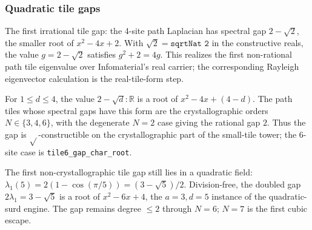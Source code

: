 \subsubsection{Quadratic tile gaps}

\begin{theorem}\label{thm:tile4-irrational-gap}\leanok{}
The first irrational tile gap: the 4-site path Laplacian has spectral gap
$2-\sqrt2$, the smaller root of $x^2-4x+2$. With
$\sqrt2=\texttt{sqrtNat 2}$ in the constructive reals, the value
$g=2-\sqrt2$ satisfies $g^2+2=4g$. This realizes the first non-rational path
tile eigenvalue over Infomaterial's real carrier; the corresponding Rayleigh
eigenvector calculation is the real-tile-form step.
\end{theorem}

\begin{theorem}\label{thm:tile-crystallographic-gap}\leanok{}
For $1\le d\le4$, the value $2-\sqrt d:\mathbb R$ is a root of
$x^2-4x+(4-d)$. The path tiles whose spectral gaps have this form are the
crystallographic orders $N\in\{3,4,6\}$, with the degenerate $N=2$ case giving
the rational gap $2$. Thus the gap is $\sqrt{}$-constructible on the
crystallographic part of the small-tile tower; the $6$-site case is
\texttt{tile6\_gap\_char\_root}.
\end{theorem}

\begin{theorem}\label{thm:tile5-golden-gap}\leanok{}
The first non-crystallographic tile gap still lies in a quadratic field:
$\lambda_1(5)=2(1-\cos(\pi/5))=(3-\sqrt5)/2$. Division-free, the doubled gap
$2\lambda_1=3-\sqrt5$ is a root of $x^2-6x+4$, the $a=3,d=5$ instance of the
quadratic-surd engine. The gap remains degree $\le2$ through $N=6$; $N=7$ is
the first cubic escape.
\end{theorem}
